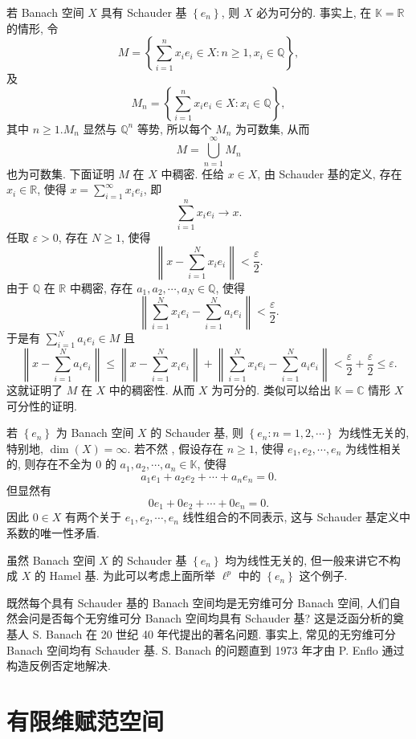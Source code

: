 \documentclass[openany]{ctexbook}
\theoremstyle{kaiti}
\theoremstyle{normal}
\begin{document}
若 Banach 空间 $X$ 具有 Schauder 基 $\left\{e_n\right\}$, 则 $X$ 必为可分的. 事实上, 在 $\mathbb{K}=\mathbb{R}$ 的情形, 令
$$
M=\left\{\sum_{i=1}^n x_{i} e_{i} \in X: n \geqslant 1, x_{i} \in \mathbb{Q}\right\},
$$
及
$$
M_n=\left\{\sum_{i=1}^n x_{i} e_{i} \in X: x_{i} \in \mathbb{Q}\right\},
$$
其中 $n \geqslant 1. M_n$ 显然与 $\mathbb{Q}^n$ 等势, 所以每个 $M_n$ 为可数集, 从而
$$
M=\bigcup_{n=1}^{\infty} M_n
$$
也为可数集. 下面证明 $M$ 在 $X$ 中稠密. 任给 $x \in X$, 由 Schauder 基的定义, 存在 $x_{i} \in \mathbb{R}$, 使得 $x=\sum_{i=1}^{\infty} x_{i} e_{i}$, 即
$$
\sum_{i=1}^n x_{i} e_{i} \rightarrow x.
$$
任取 $\varepsilon>0$, 存在 $N \geqslant 1$, 使得
$$
\left\|x-\sum_{i=1}^{N} x_{i} e_{i}\right\|<\frac{\varepsilon}{2}.
$$
由于 $\mathbb{Q}$ 在 $\mathbb{R}$ 中稠密, 存在 $a_1, a_2, \cdots, a_{N} \in \mathbb{Q}$, 使得
$$
\left\|\sum_{i=1}^{N} x_{i} e_{i}-\sum_{i=1}^{N} a_{i} e_{i}\right\|<\frac{\varepsilon}{2}.
$$
于是有 $\sum_{i=1}^{N} a_{i} e_{i} \in M$ 且
$$
\left\|x-\sum_{i=1}^{N} a_{i} e_{i}\right\| \leqslant\left\|x-\sum_{i=1}^{N} x_{i} e_{i}\right\|+\left\|\sum_{i=1}^{N} x_{i} e_{i}-\sum_{i=1}^{N} a_{i} e_{i}\right\|<\frac{\varepsilon}{2}+\frac{\varepsilon}{2} \leqslant \varepsilon.
$$
这就证明了 $M$ 在 $X$ 中的稠密性. 从而 $X$ 为可分的. 类似可以给出 $\mathbb{K}=\mathbb{C}$ 情形 $X$ 可分性的证明.

若 $\left\{e_n\right\}$ 为 Banach 空间 $X$ 的 Schauder 基, 则 $\left\{e_n: n=1,2, \cdots\right\}$ 为线性无关的, 特别地, $\operatorname{dim}(X)=\infty$. 若不然 , 假设存在 $n \geqslant 1$, 使得 $e_1, e_2, \cdots, e_n$ 为线性相关的, 则存在不全为 0 的 $a_1, a_2, \cdots, a_n \in \mathbb{K}$, 使得
$$
a_1 e_1+a_2 e_2+\cdots+a_n e_n=0.
$$
但显然有
$$
0 e_1+0 e_2+\cdots+0 e_n=0.
$$
因此 $0 \in X$ 有两个关于 $e_1, e_2, \cdots, e_n$ 线性组合的不同表示, 这与 Schauder 基定义中系数的唯一性矛盾.

虽然 Banach 空间 $X$ 的 Schauder 基 $\left\{e_n\right\}$ 均为线性无关的, 但一般来讲它不构成 $X$ 的 Hamel 基. 为此可以考虑上面所举 $\ell^{p}$ 中的 $\left\{e_n\right\}$ 这个例子.

既然每个具有 Schauder 基的 Banach 空间均是无穷维可分 Banach 空间, 人们自然会问是否每个无穷维可分 Banach 空间均具有 Schauder 基? 这是泛函分析的奠基人 S. Banach 在 20 世纪 40 年代提出的著名问题. 事实上, 常见的无穷维可分 Banach 空间均有 Schauder 基. S. Banach 的问题直到 1973 年才由 P. Enflo 通过构造反例否定地解决.

\section{有限维赋范空间}
\end{document}
